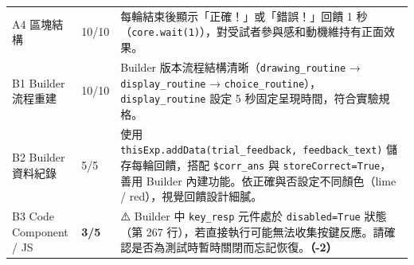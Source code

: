 \documentclass[14pt,]{extarticle}
\begin{document}
\begin{longtable}[]{@{}lll@{}}
\begin{minipage}[t]{0.07\columnwidth}
A4 區塊結構\strut
\end{minipage} & \begin{minipage}[t]{0.03\columnwidth}\raggedright
10/10\strut
\end{minipage} & \begin{minipage}[t]{0.82\columnwidth}\raggedright
每輪結束後顯示「正確！」或「錯誤！」回饋 1
秒（\texttt{core.wait(1)}），對受試者參與感和動機維持有正面效果。\strut
\end{minipage}\tabularnewline
\begin{minipage}[t]{0.07\columnwidth}\raggedright
B1 Builder 流程重建\strut
\end{minipage} & \begin{minipage}[t]{0.03\columnwidth}\raggedright
10/10\strut
\end{minipage} & \begin{minipage}[t]{0.82\columnwidth}\raggedright
Builder 版本流程結構清晰（\texttt{drawing\_routine} →
\texttt{display\_routine} →
\texttt{choice\_routine}），\texttt{display\_routine} 設定 5
秒固定呈現時間，符合實驗規格。\strut
\end{minipage}\tabularnewline
\begin{minipage}[t]{0.07\columnwidth}\raggedright
B2 Builder 資料紀錄\strut
\end{minipage} & \begin{minipage}[t]{0.03\columnwidth}\raggedright
5/5\strut
\end{minipage} & \begin{minipage}[t]{0.82\columnwidth}\raggedright
使用
\texttt{thisExp.addData(\textquotesingle{}trial\_feedback\textquotesingle{},\ feedback\_text)}
儲存每輪回饋，搭配 \texttt{\$corr\_ans} 與
\texttt{storeCorrect=True}，善用 Builder
內建功能。依正確與否設定不同顏色（lime / red），視覺回饋設計細膩。\strut
\end{minipage}\tabularnewline
\begin{minipage}[t]{0.07\columnwidth}\raggedright
B3 Code Component / JS\strut
\end{minipage} & \begin{minipage}[t]{0.03\columnwidth}\raggedright
\textbf{3/5}\strut
\end{minipage} & \begin{minipage}[t]{0.82\columnwidth}\raggedright
⚠️ Builder 中 \texttt{key\_resp} 元件處於 \texttt{disabled=True}
狀態（第 267
行），若直接執行可能無法收集按鍵反應。請確認是否為測試時暫時關閉而忘記恢復。\textbf{（-2）}\strut
\end{minipage}\tabularnewline

\end{longtable}
\end{document}
